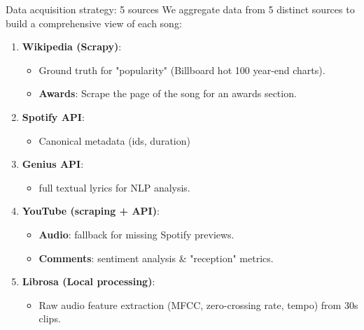 \documentclass{beamer}
\begin{document}
\begin{frame}{Data acquisition strategy: 5 sources}
    We aggregate data from 5 distinct sources to build a comprehensive view of each song:
    
    \begin{enumerate}
        \item \textbf{Wikipedia (Scrapy)}: 
        \begin{itemize} \item Ground truth for "popularity" (Billboard hot 100 year-end charts).
        \item \textbf{Awards}: Scrape the page of the song for an awards section.
        \end{itemize}
        
        \item \textbf{Spotify API}: 
        \begin{itemize} \item Canonical metadata (ids, duration)\end{itemize}
    
        \item \textbf{Genius API}: 
        \begin{itemize} \item full textual lyrics for NLP analysis. \end{itemize}
        
        \item \textbf{YouTube (scraping + API)}: 
        \begin{itemize} \item \textbf{Audio}: fallback for missing Spotify previews.
        \item \textbf{Comments}: sentiment analysis \& "reception" metrics. \end{itemize}
        
        \item \textbf{Librosa (Local processing)}: 
        \begin{itemize} \item Raw audio feature extraction (MFCC, zero-crossing rate, tempo) from 30s clips. \end{itemize}
    \end{enumerate}
\end{frame}
\end{document}
